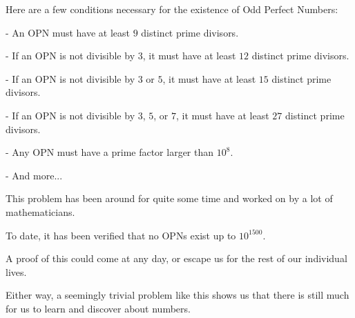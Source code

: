 \documentclass{beamer}
\begin{document}
\begin{frame}

Here are a few conditions necessary for the existence of Odd Perfect Numbers:

\bigskip

- An OPN must have at least $9$ distinct prime divisors.

- If an OPN is not divisible by $3$, it must have at least $12$ distinct prime divisors.

- If an OPN is not divisible by $3$ or $5$, it must have at least $15$ distinct prime divisors.

- If an OPN is not divisible by $3$, $5$, or $7$, it must have at least $27$ distinct prime divisors.

- Any OPN must have a prime factor larger than $10^8$.

- And more...

\end{frame}

\begin{frame}

This problem has been around for quite some time and worked on by a lot of mathematicians.

To date, it has been verified that no OPNs exist up to $10^{1500}$.

\bigskip

A proof of this could come at any day, or escape us for the rest of our individual lives. 

Either way, a seemingly trivial problem like this shows us that there is still much for us to learn and discover about numbers.

\end{frame}
\end{document}
